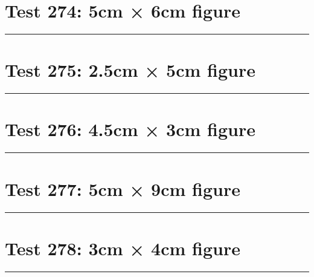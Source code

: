 \documentclass[a4paper,11pt]{article}
\begin{document}
\section*{Test 274: 5cm × 6cm figure}
\begin{swarmwrap}%
  \begin{minipage}[t]{5cm}
    \centering
    \rule{\linewidth}{6cm}
  \end{minipage}%
\end{swarmwrap}%
\swarmwrapnext
\lipsum[92]
\lipsum[93]
\lipsum[94]
\lipsum[95]
\section*{Test 275: 2.5cm × 5cm figure}
\begin{swarmwrap}%
  \begin{minipage}[t]{2cm}
    \centering
    \rule{\linewidth}{5cm}
  \end{minipage}%
\end{swarmwrap}%
\swarmwrapnext
\lipsum[37]
\lipsum[38]
\lipsum[39]
\lipsum[40]
\lipsum[41]
\section*{Test 276: 4.5cm × 3cm figure}
\begin{swarmwrap}%
  \begin{minipage}[t]{4cm}
    \centering
    \rule{\linewidth}{3cm}
  \end{minipage}%
\end{swarmwrap}%
\swarmwrapnext
\lipsum[81]
\lipsum[82]
\lipsum[83]
\section*{Test 277: 5cm × 9cm figure}
\begin{swarmwrap}%
  \begin{minipage}[t]{5cm}
    \centering
    \rule{\linewidth}{9cm}
  \end{minipage}%
\end{swarmwrap}%
\swarmwrapnext
\lipsum[150]
\lipsum[1]
\lipsum[2]
\section*{Test 278: 3cm × 4cm figure}
\begin{swarmwrap}%
  \begin{minipage}[t]{3cm}
    \centering
    \rule{\linewidth}{4cm}
  \end{minipage}%
\end{swarmwrap}%
\swarmwrapnext
\lipsum[77]
\lipsum[78]
\lipsum[79]
\end{document}

